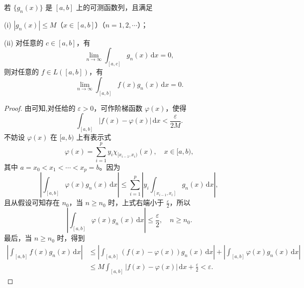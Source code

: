 \documentclass[../../main.tex]{subfiles}%
\begin{document}
\begin{theorem}\label{theorem:Riemann-Lebesgue引理的推广}
若 \( \{g_n(x)\} \) 是 \([a,b]\) 上的可测函数列，且满足

(i) \( |g_n(x)| \leqslant M \)（\( x \in [a,b] \)）（\( n = 1,2,\cdots \)）；

(ii) 对任意的 \( c \in [a,b] \)，有
\[
\lim_{n \to \infty} \int_{[a,c]} g_n(x) \, \mathrm{d}x = 0,
\]
则对任意的 \( f \in L([a,b]) \)，有
\[
\lim_{n \to \infty} \int_{[a,b]} f(x) g_n(x) \, \mathrm{d}x = 0.
\]
\end{theorem}
\begin{proof}

由可知,对任给的 \( \varepsilon > 0 \)，可作阶梯函数 \( \varphi(x) \)，使得
\[
\int_{[a,b]} |f(x) - \varphi(x)| \, \mathrm{d}x < \frac{\varepsilon}{2M}.
\]
不妨设 \( \varphi(x) \) 在 \([a,b)\) 上有表示式
\[
\varphi(x) = \sum_{i=1}^p y_i \chi_{[x_{i-1},x_i)}(x), \quad x \in [a,b),
\]
其中 \( a = x_0 < x_1 < \cdots < x_p = b \)。因为
\[
\left| \int_{[a,b]} \varphi(x) g_n(x) \, \mathrm{d}x \right| \leqslant \sum_{i=1}^p \left| y_i \int_{[x_{i-1},x_i]} g_n(x) \, \mathrm{d}x \right|,
\]
且从假设可知存在 \( n_0 \)，当 \( n \geqslant n_0 \) 时，上式右端小于 \(\frac{ \varepsilon}{2} \)，所以
\[
\left| \int_{[a,b]} \varphi(x) g_n(x) \, \mathrm{d}x \right| \leqslant \frac{\varepsilon}{2}, \quad n \geqslant n_0.
\]
最后，当 \( n \geqslant n_0 \) 时，得到
\begin{align*}
\left| \int_{[a,b]} f(x) g_n(x) \, \mathrm{d}x \right| &\leqslant \left| \int_{[a,b]} (f(x) - \varphi(x)) g_n(x) \, \mathrm{d}x \right| + \left| \int_{[a,b]} \varphi(x) g_n(x) \, \mathrm{d}x \right| \\
&\leqslant M \int_{[a,b]} |f(x) - \varphi(x)| \, \mathrm{d}x + \frac{\varepsilon}{2} < \varepsilon.
\end{align*}

\end{proof}
\end{document}
